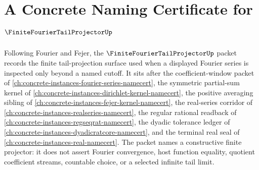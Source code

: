 \chapter{A Concrete Naming Certificate for $\FiniteFourierTailProjectorUp$}
\label{ch:concrete-instances-finite-fourier-tail-projector-namecert}

Following Fourier and Fejer, the $\FiniteFourierTailProjectorUp$ packet records the finite tail-projection surface used when a displayed Fourier series is inspected only beyond a named cutoff. It sits after the coefficient-window packet of \autoref{ch:concrete-instances-fourier-series-namecert}, the symmetric partial-sum kernel of \autoref{ch:concrete-instances-dirichlet-kernel-namecert}, the positive averaging sibling of \autoref{ch:concrete-instances-fejer-kernel-namecert}, the real-series corridor of \autoref{ch:concrete-instances-realseries-namecert}, the regular rational readback of \autoref{ch:concrete-instances-regseqrat-namecert}, the dyadic tolerance ledger of \autoref{ch:concrete-instances-dyadicratcore-namecert}, and the terminal real seal of \autoref{ch:concrete-instances-real-namecert}. The packet names a constructive finite projector: it does not assert Fourier convergence, host function equality, quotient coefficient streams, countable choice, or a selected infinite tail limit.

